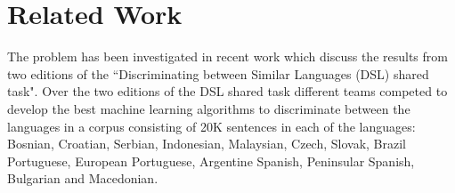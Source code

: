 \section{Related Work}

The problem has been investigated in recent work \cite{DSLEvaluation}\cite{DSL2015} which discuss the results from two editions of the ``Discriminating between Similar Languages (DSL) shared task". Over the two editions of the DSL shared task different teams competed to develop the best machine learning algorithms to discriminate between the languages in a corpus consisting of 20K sentences in each of the languages: Bosnian, Croatian, Serbian, Indonesian, Malaysian, Czech, Slovak, Brazil Portuguese, European Portuguese, Argentine Spanish, Peninsular Spanish, Bulgarian and Macedonian.